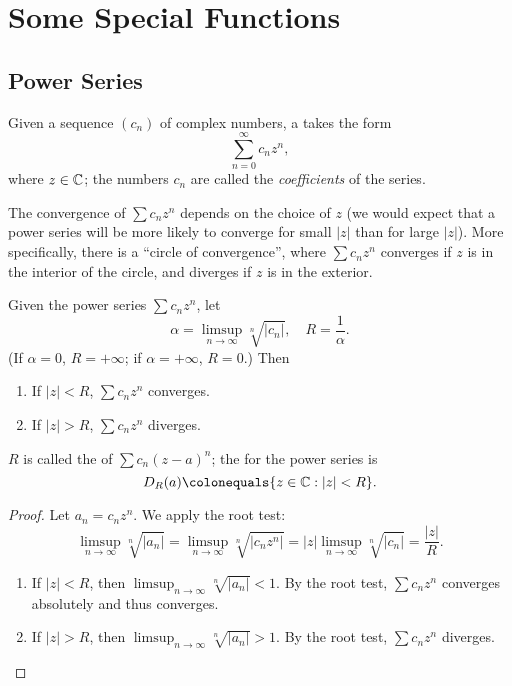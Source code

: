 \chapter{Some Special Functions}\label{chap:special-functions}
\section{Power Series}
\begin{definition}
Given a sequence $(c_n)$ of complex numbers, a  takes the form
\[\sum_{n=0}^{\infty}c_nz^n,\]
where $z\in\mathbb C$; the numbers $c_n$ are called the \emph{coefficients} of the series.
\end{definition}

The convergence of $\sum c_nz^n$ depends on the choice of $z$ (we would expect that a power series will be more likely to converge for small $|z|$ than for large $|z|$). More specifically, there is a ``circle of convergence'', where $\sum c_nz^n$ converges if $z$ is in the interior of the circle, and diverges if $z$ is in the exterior.

\begin{lemma}\label{lemma:radius-convergence}
Given the power series $\sum c_nz^n$, let
\begin{equation}\label{eqn:hadamard-formula-power-series}
\alpha=\limsup_{n\to\infty}\sqrt[n]{|c_n|},\quad R=\frac{1}{\alpha}.
\end{equation}
(If $\alpha=0$, $R=+\infty$; if $\alpha=+\infty$, $R=0$.) Then 
\begin{enumerate}[label=(\roman*)]
\item If $|z|<R$, $\sum c_nz^n$ converges.
\item If $|z|>R$, $\sum c_nz^n$ diverges.
\end{enumerate}
\end{lemma}

$R$ is called the  of $\sum c_n(z-a)^n$; the  for the power series is
\[D_R(a)\colonequals\{z\in\CC:|z|<R\}.\]

\begin{proof}
Let $a_n=c_nz^n$. We apply the root test:
\[\limsup_{n\to\infty}\sqrt[n]{|a_n|}=\limsup_{n\to\infty}\sqrt[n]{|c_nz^n|}=|z|\limsup_{n\to\infty}\sqrt[n]{|c_n|}=\frac{|z|}{R}.\]
\begin{enumerate}[label=(\roman*)]
\item If $|z|<R$, then $\displaystyle\limsup_{n\to\infty}\sqrt[n]{|a_n|}<1$. By the root test, $\sum c_nz^n$ converges absolutely and thus converges.
\item If $|z|>R$, then $\displaystyle\limsup_{n\to\infty}\sqrt[n]{|a_n|}>1$. By the root test, $\sum c_nz^n$ diverges.
\end{enumerate}
\end{proof}

